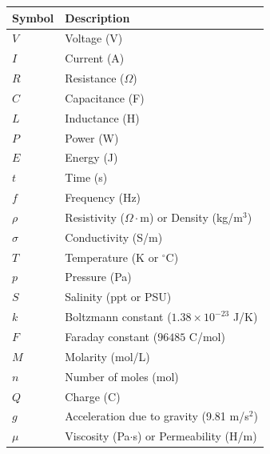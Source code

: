 \documentclass[a4paper,12pt]{report}
\begin{document}
{{    \begin{tabular}{ll}
    \textbf{Symbol} & \textbf{Description} \\
    \hline
    $V$ & Voltage (V) \\
    $I$ & Current (A) \\
    $R$ & Resistance ($\Omega$) \\
    $C$ & Capacitance (F) \\
    $L$ & Inductance (H) \\
    $P$ & Power (W) \\
    $E$ & Energy (J) \\
    $t$ & Time (s) \\
    $f$ & Frequency (Hz) \\
    $\rho$ & Resistivity ($\Omega \cdot$m) or Density (kg/m$^3$) \\
    $\sigma$ & Conductivity (S/m) \\
    $T$ & Temperature (K or $^\circ$C) \\
    $p$ & Pressure (Pa) \\
    $S$ & Salinity (ppt or PSU) \\
    $k$ & Boltzmann constant ($1.38 \times 10^{-23}$ J/K) \\
    $F$ & Faraday constant ($96485$ C/mol) \\
    $M$ & Molarity (mol/L) \\
    $n$ & Number of moles (mol) \\
    $Q$ & Charge (C) \\
    $g$ & Acceleration due to gravity (9.81 m/s$^2$) \\
    $\mu$ & Viscosity (Pa$\cdot$s) or Permeability (H/m) \\
    \end{tabular}

\newpage
    \tableofcontents



\newpage
\pagestyle{fancy}










\appendix



}}%
\end{document}
